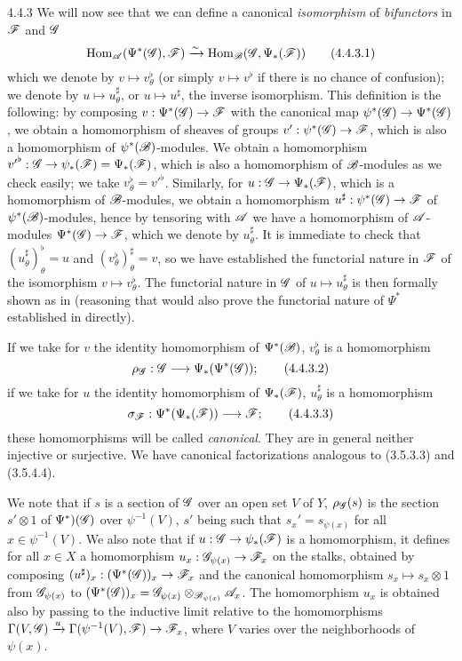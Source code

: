 \begin{env}{4.4.3}
\label{env-0.4.4.3}
We will now see that we can define a canonical \emph{isomorphism} of \emph{bifunctors} in
$\mathscr{F}$ and $\mathscr{G}$
\[
  {\mathop{\mathrm{Hom}}\nolimits}_\mathscr{A}(\Psi^*(\mathscr{G}),\mathscr{F})\xrightarrow{\sim}{\mathop{\mathrm{Hom}}\nolimits}_\mathscr{B}(\mathscr{G},\Psi_*(\mathscr{F}))
  \tag{4.4.3.1}
\]
which we denote by $v\mapsto v_\theta^\flat$ (or simply $v\mapsto v^\flat$ if there is no
chance of confusion); we denote by $u\mapsto u_\theta^\sharp$, or $u\mapsto u^\sharp$, the
inverse isomorphism. This definition is the following: by composing
$v:\Psi^*(\mathscr{G})\to\mathscr{F}$ with the canonical map $\psi^*(\mathscr{G})\to\Psi^*(\mathscr{G})$, we
obtain a homomorphism of sheaves of groups $v':\psi^*(\mathscr{G})\to\mathscr{F}$, which is also a
homomorphism of $\psi^*(\mathscr{B})$-modules. We obtain  a homomorphism
${v'}^\flat:\mathscr{G}\to\psi_*(\mathscr{F})=\Psi_*(\mathscr{F})$, which is also a homomorphism of
$\mathscr{B}$-modules as we
check easily; we take $v_\theta^\flat={v'}^\flat$. Similarly, for
$u:\mathscr{G}\to\Psi_*(\mathscr{F})$, which is a homomorphism of $\mathscr{B}$-modules, we obtain
 a homomorphism $u^\sharp:\psi^*(\mathscr{G})\to\mathscr{F}$ of
$\psi^*(\mathscr{B})$-modules, hence by tensoring with $\mathscr{A}$ we have a homomorphism of
$\mathscr{A}$-modules $\Psi^*(\mathscr{G})\to\mathscr{F}$, which we denote by $u_\theta^\sharp$. It is
immediate to check that $(u_\theta^\sharp)_\theta^\flat=u$ and
$(v_\theta^\flat)_\theta^\sharp=v$, so we have established the functorial nature in $\mathscr{F}$
of the isomorphism $v\mapsto v_\theta^\flat$. The functorial nature in $\mathscr{G}$ of
$u\mapsto u_\theta^\sharp$ is then formally shown as in  (reasoning that
would also prove the functorial nature of $\Psi^*$ established in 
directly).

If we take for $v$ the identity homomorphism of $\Psi^*(\mathscr{B})$, $v_\theta^\flat$ is a
homomorphism
\[
  \rho_\mathscr{G}:\mathscr{G}\longrightarrow\Psi_*(\Psi^*(\mathscr{G}));
  \tag{4.4.3.2}
\]
if we take for $u$ the identity homomorphism of $\Psi_*(\mathscr{F})$, $u_\theta^\sharp$ is a
homomorphism
\[
  \sigma_\mathscr{F}:\Psi^*(\Psi_*(\mathscr{F}))\longrightarrow\mathscr{F};
  \tag{4.4.3.3}
\]
these homomorphisms will be called \emph{canonical}. They are in general neither injective or
surjective. We have canonical factorizations analogous to (3.5.3.3) and (3.5.4.4).

We note that if $s$ is a section of $\mathscr{G}$ over an open set $V$ of $Y$, $\rho_\mathscr{G}(s)$ is
the section $s'\otimes 1$ of $\Psi^*)(\mathscr{G})$ over $\psi^{-1}(V)$, $s'$ being such that
$s_x'=s_{\psi(x)}$ for all $x\in\psi^{-1}(V)$. We also note that if
$u:\mathscr{G}\to\psi_*(\mathscr{F})$ is a homomorphism, it defines for all $x\in X$ a homomorphism
$u_x:\mathscr{G}_{\psi(x)}\to\mathscr{F}_x$ on the stalks, obtained by composing
$(u^\sharp)_x:(\Psi^*(\mathscr{G}))_x\to\mathscr{F}_x$ and the canonical homomorphism
$s_x\mapsto s_x\otimes 1$ from $\mathscr{G}_{\psi(x)}$ to
$(\Psi^*(\mathscr{G}))_x=\mathscr{G}_{\psi(x)}\otimes_{\mathscr{B}_{\psi(x)}}\mathscr{A}_x$. The homomorphism
$u_x$ is obtained also by passing to the inductive limit relative to the homomorphisms
$\Gamma(V,\mathscr{G})\xrightarrow{u}\Gamma(\psi^{-1}(V),\mathscr{F})\to\mathscr{F}_x$, where $V$ varies
over the neighborhoods of $\psi(x)$.
\end{env}

